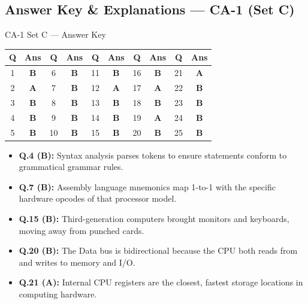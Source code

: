 


\newpage
\subsection*{Answer Key \& Explanations --- CA-1 (Set C)}

\begin{answerkeytable}{CA-1 Set C --- Answer Key}
\begin{tabular}{*{10}{c}}
\toprule
\textbf{Q} & \textbf{Ans} & \textbf{Q} & \textbf{Ans} & \textbf{Q} & \textbf{Ans} & \textbf{Q} & \textbf{Ans} & \textbf{Q} & \textbf{Ans} \\
\midrule
1 & \textbf{B} & 6 & \textbf{B} & 11 & \textbf{B} & 16 & \textbf{B} & 21 & \textbf{A} \\
2 & \textbf{A} & 7 & \textbf{B} & 12 & \textbf{A} & 17 & \textbf{A} & 22 & \textbf{B} \\
3 & \textbf{B} & 8 & \textbf{B} & 13 & \textbf{B} & 18 & \textbf{B} & 23 & \textbf{B} \\
4 & \textbf{B} & 9 & \textbf{B} & 14 & \textbf{B} & 19 & \textbf{A} & 24 & \textbf{B} \\
5 & \textbf{B} & 10 & \textbf{B} & 15 & \textbf{B} & 20 & \textbf{B} & 25 & \textbf{B} \\
\bottomrule
\end{tabular}
\end{answerkeytable}

\begin{expbox}
\begin{itemize}[leftmargin=5mm]
    \item \textbf{Q.4 (B):} Syntax analysis parses tokens to ensure statements conform to grammatical grammar rules.
    \item \textbf{Q.7 (B):} Assembly language mnemonics map 1-to-1 with the specific hardware opcodes of that processor model.
    \item \textbf{Q.15 (B):} Third-generation computers brought monitors and keyboards, moving away from punched cards.
    \item \textbf{Q.20 (B):} The Data bus is bidirectional because the CPU both reads from and writes to memory and I/O.
    \item \textbf{Q.21 (A):} Internal CPU registers are the closest, fastest storage locations in computing hardware.
\end{itemize}
\end{expbox}

\newpage
